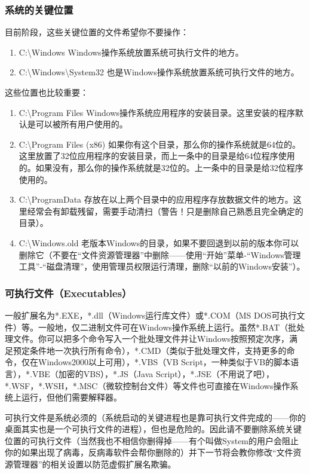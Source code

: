 \subsubsection{系统的关键位置}
目前阶段，这些关键位置的文件希望你不要操作：
\begin{enumerate}
	\item C:\textbackslash Windows  Windows操作系统放置系统可执行文件的地方。
	\item C:\textbackslash Windows\textbackslash System32  也是Windows操作系统放置系统可执行文件的地方。
\end{enumerate}\par
这些位置也比较重要：
\begin{enumerate}
	\item C:\textbackslash Program Files Windows操作系统应用程序的安装目录。这里安装的程序默认是可以被所有用户使用的。
	\item C:\textbackslash Program Files (x86) 如果你有这个目录，那么你的操作系统就是64位的。这里放置了32位应用程序的安装目录，而上一条中的目录是给64位程序使用的。如果没有，那么你的操作系统就是32位的。上一条中的目录是给32位程序使用的。
	\item C:\textbackslash ProgramData  存放在以上两个目录中的应用程序存放数据文件的地方。这里经常会有卸载残留，需要手动清扫（警告！只是删除自己熟悉且完全确定的目录）。
	\item C:\textbackslash Windows.old  老版本Windows的目录，如果不要回退到以前的版本你可以删除它（不要在“文件资源管理器”中删除——使用“开始”菜单-“Windows管理工具”-“磁盘清理”，使用管理员权限运行清理，删除“以前的Windows安装”）。
\end{enumerate}
\subsubsection{可执行文件（Executables）}
\label{sec:exe}一般扩展名为*.EXE，*.dll（Windows运行库文件）或*.COM（MS DOS可执行文件）等。一般地，仅二进制文件可在Windows操作系统上运行。虽然*.BAT（批处理文件。你可以把多个命令写入一个批处理文件并让Windows按照预定次序，满足预定条件地一次执行所有命令），*.CMD（类似于批处理文件，支持更多的命令，仅在Windows2000以上可用），*.VBS（VB Script，一种类似于VB的脚本语言），*.VBE（加密的VBS），*.JS（Java Script），*.JSE（不用说了吧），*.WSF，*.WSH，*.MSC（微软控制台文件）等文件也可直接在Windows操作系统上运行，但他们需要解释器。\par
可执行文件是系统必须的（系统启动的关键进程也是靠可执行文件完成的——你的桌面其实也是一个可执行文件的进程），但也是危险的。因此请不要删除系统关键位置的可执行文件（当然我也不相信你删得掉——有个叫做System的用户会阻止你的如果出现了病毒，反病毒软件会帮你删除的）并{\color{red}{千万别双击自己不明白的可执行文件！！！！！！}}下一节将会教你修改“文件资源管理器”的相关设置以防范虚假扩展名欺骗。

